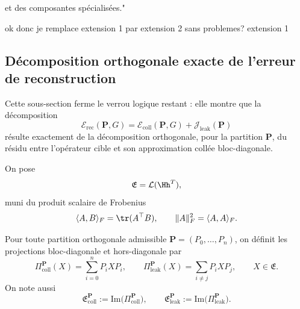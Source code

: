















































 et des composantes spécialisées."

ok donc je remplace extension 1 par extension 2 sans problemes?
extension 1
\subsection{Décomposition orthogonale exacte de l'erreur de reconstruction}

Cette sous-section ferme le verrou logique restant : elle montre que la décomposition
\[
\mathcal E_{\mathrm{rec}}(\mathbf P,G)
=
\mathcal E_{\mathrm{coll}}(\mathbf P,G)
+
\mathcal J_{\mathrm{leak}}(\mathbf P)
\]
résulte exactement de la décomposition orthogonale, pour la partition \(\mathbf P\), du résidu
entre l'opérateur cible et son approximation collée bloc-diagonale.

\begin{definition}
On pose
\[
\mathfrak E=\mathcal L(\Hh^T),
\]
muni du produit scalaire de Frobenius
\[
\langle A,B\rangle_F=\tr(A^\top B),
\qquad
\|A\|_F^2=\langle A,A\rangle_F.
\]
\end{definition}

\begin{definition}
Pour toute partition orthogonale admissible \(\mathbf P=(P_0,\dots,P_n)\), on définit les projections
bloc-diagonale et hors-diagonale par
\[
\Pi_{\mathrm{coll}}^{\mathbf P}(X)
=
\sum_{i=0}^n P_iXP_i,
\qquad
\Pi_{\mathrm{leak}}^{\mathbf P}(X)
=
\sum_{i\neq j}P_iXP_j,
\qquad
X\in\mathfrak E.
\]
On note aussi
\[
\mathfrak E_{\mathrm{coll}}^{\mathbf P}:=\mathrm{Im}\bigl(\Pi_{\mathrm{coll}}^{\mathbf P}\bigr),
\qquad
\mathfrak E_{\mathrm{leak}}^{\mathbf P}:=\mathrm{Im}\bigl(\Pi_{\mathrm{leak}}^{\mathbf P}\bigr).
\]
\end{definition}

